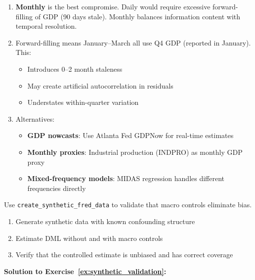 \begin{enumerate}
    \item[(a)] \textbf{Monthly} is the best compromise. Daily would require excessive forward-filling of GDP (90 days stale). Monthly balances information content with temporal resolution.

    \item[(b)] Forward-filling means January--March all use Q4 GDP (reported in January). This:
    \begin{itemize}
        \item Introduces 0--2 month staleness
        \item May create artificial autocorrelation in residuals
        \item Understates within-quarter variation
    \end{itemize}

    \item[(c)] Alternatives:
    \begin{itemize}
        \item \textbf{GDP nowcasts}: Use Atlanta Fed GDPNow for real-time estimates
        \item \textbf{Monthly proxies}: Industrial production (INDPRO) as monthly GDP proxy
        \item \textbf{Mixed-frequency models}: MIDAS regression handles different frequencies directly
    \end{itemize}
\end{enumerate}

\begin{exercise}
\label{ex:synthetic_validation}
Use \texttt{create\_synthetic\_fred\_data} to validate that macro controls eliminate bias.

\begin{enumerate}
    \item[(a)] Generate synthetic data with known confounding structure
    \item[(b)] Estimate DML without and with macro controls
    \item[(c)] Verify that the controlled estimate is unbiased and has correct coverage
\end{enumerate}
\end{exercise}

\textbf{Solution to Exercise~\ref{ex:synthetic_validation}:}

